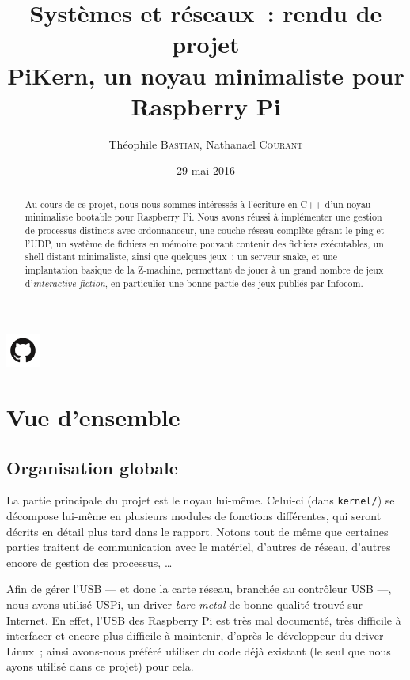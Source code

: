 \documentclass[11pt,a4paper]{article}
\author{Théophile \textsc{Bastian}, Nathanaël \textsc{Courant}}
\title{Systèmes et réseaux~: rendu de projet\\
{\small PiKern, un noyau minimaliste pour Raspberry Pi}}
\date{29 mai 2016}
\newcommand{\fname}[1]{\texttt{#1}} %
\begin{document}
\maketitle

\begin{abstract}
Au cours de ce projet, nous nous sommes intéressés à l'écriture en C++ d'un
noyau minimaliste bootable pour Raspberry Pi. Nous avons réussi à implémenter
une gestion de processus distincts avec ordonnanceur, une couche réseau
complète gérant le ping et l'UDP, un système de fichiers en mémoire
pouvant contenir des fichiers exécutables, un shell distant
minimaliste, ainsi que quelques jeux~: un serveur snake, et une
implantation basique de la Z-machine, permettant de jouer à un grand
nombre de jeux d'\textit{interactive fiction}, en particulier une
bonne partie des jeux publiés par Infocom.
\end{abstract}

\begin{center}
	\href{https://github.com/tobast/sysres-pikern}
		{\Large \includegraphics[height=3em]{github.png}
		}
\end{center}

\tableofcontents
\newpage

\section{Vue d'ensemble}

\subsection{Organisation globale}
La partie principale du projet est le noyau lui-même. Celui-ci (dans
\fname{kernel/}) se décompose lui-même en plusieurs modules de fonctions
différentes, qui seront décrits en détail plus tard dans le rapport. Notons
tout de même que certaines parties traitent de communication avec le matériel,
d'autres de réseau, d'autres encore de gestion des processus, \ldots

Afin de gérer l'USB --- et donc la carte réseau, branchée au contrôleur
USB ---, nous avons utilisé \href{https://github.com/rsta2/uspi}{USPi}, un
driver \textit{bare-metal} de bonne qualité trouvé sur Internet. En effet,
l'USB des Raspberry Pi est très mal documenté, très difficile à interfacer
et encore plus difficile à maintenir, d'après le développeur du driver Linux~;
ainsi avons-nous préféré utiliser du code déjà existant (le seul que nous ayons
utilisé dans ce projet) pour cela.
\end{document}
